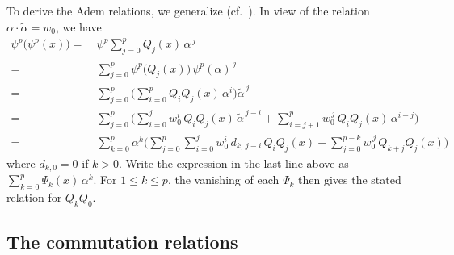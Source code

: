 \documentclass{gtpart}
\theoremstyle{definition}
\theoremstyle{remark}
\newcommand{\tA}{\widetilde{\A}}
\newcommand{\A}{\alpha}
\renewcommand{\=}{\approx}
\renewcommand{\-}{\sim}
\numberwithin{equation}{section}
\begin{document}
To derive the Adem relations, we generalize 
\cite[proof of Proposition 3.6\,(iv)]{p3} 
(cf.~\cite[proof of Proposition 6.4]{ho}).  
In view of the relation $\A \cdot \tA = w_0$, we have 
\[
 \begin{split}
  \psi^p\big(\psi^p(x)\big) = & ~ \psi^p \sum_{j = 0}^p Q_j(x) \, \A^{\,j} \\
                            = & ~ \sum_{j = 0}^p \psi^p\big(Q_j(x)\big) \, 
                                  \psi^p(\A)^{\,j} \\
                            = & ~ \sum_{j = 0}^p \Bigg( \sum_{i = 0}^p 
                                  Q_i Q_j(x) \, \A^i \Bigg) \tA^{\,j} \\
                            = & ~ \sum_{j = 0}^p \Bigg( \sum_{i = 0}^j w_0^i \, 
                                  Q_i Q_j(x) \, \tA^{\,j - i} 
                                + \sum_{i = j + 1}^p w_0^{\,j} \, Q_i Q_j(x) \, 
                                \A^{i - j} \Bigg) \\
                            = & ~ \sum_{k = 0}^p \A^k \Bigg( \sum_{j = 0}^p 
                                  \sum_{i = 0}^j w_0^i \, d_{k,\,j - i} \, 
                                  Q_i Q_j(x) + \sum_{j = 0}^{p - k} w_0^{\,j} \, 
                                  Q_{k + j} Q_j (x) \Bigg) 
 \end{split}
\]
where $d_{k,0} = 0$ if $k > 0$.  Write the expression in the last line above as 
$\sum_{k = 0}^p \Psi_k(x) \, \A^k$.  For $1 \leq k \leq p$, the vanishing of 
each $\Psi_k$ then gives the stated relation for $Q_k Q_0$.  



\subsection{The commutation relations}
\label{subsec:comm}
\end{document}
